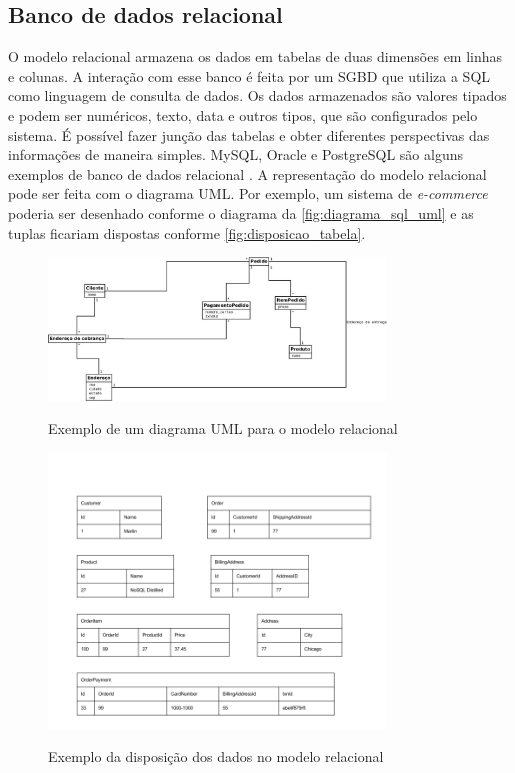 \subsection{Banco de dados relacional}
\label{subsec:relationaldatabasetype}
O modelo relacional armazena os dados em tabelas de duas dimensões em linhas e colunas. A interação com esse banco é feita por um \ac{SGBD} que utiliza a \ac{SQL} como linguagem de consulta de dados. Os dados armazenados são valores tipados e podem ser numéricos, texto, data e outros tipos, que são configurados pelo sistema. É possível fazer junção das tabelas e obter diferentes perspectivas das informações de maneira simples. MySQL, Oracle e PostgreSQL são alguns exemplos de banco de dados relacional \cite{SDSW}.
A representação do modelo relacional pode ser feita com o diagrama \ac{UML}. Por exemplo, um sistema de \textit{e-commerce} poderia ser desenhado conforme o diagrama da \autoref{fig:diagrama_sql_uml} e as tuplas ficariam dispostas conforme \autoref{fig:disposicao_tabela}.
\begin{figure}[H]
    \centering
    \caption{Exemplo de um diagrama \ac{UML} para o modelo relacional}
    \includegraphics[width=0.8\textwidth]{./04-figuras/diagrama_sql_uml.jpg}
    \label{fig:diagrama_sql_uml}
\end{figure}
\begin{figure}[H]
    \centering
    \caption{Exemplo da disposição dos dados no modelo relacional}
    \includegraphics[width=0.8\textwidth]{./04-figuras/disposicao_dados_tabela.png}
    \label{fig:disposicao_tabela}
\end{figure}


